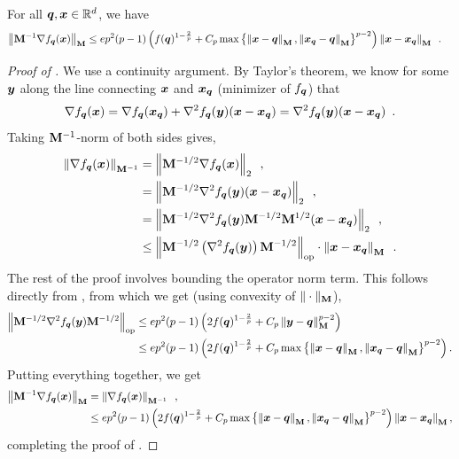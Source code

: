 \begin{lemma}
\label{lemma:self_gradient_norm_small}
For all $\bm{q},\bm{x}\in\mathbb{R}^d$, we have
\begin{align*}
    \left\lVert \mathbf{M}^{-1}\nabla f_{\bm{q}}(\bm{x}) \right\rVert_{\mathbf{M}} &\le ep^2(p-1)\left(f(\bm{q})^{1-\frac{2}{p}}+C_p\max\left\{\left\lVert \bm{x}-\bm{q} \right\rVert_{\mathbf{M}},\left\lVert \bm{x}_{\bm{q}}-\bm{q} \right\rVert_{\mathbf{M}}\right\}^{p-2}\right)\left\lVert \bm{x}-\bm{x}_{\bm{q}} \right\rVert_{\mathbf{M}}\enspace.
\end{align*}
\end{lemma}
\begin{proof}[Proof of ]
We use a continuity argument. By Taylor's theorem, we know for some $\bm{y}$ along the line connecting $\bm{x}$ and $\bm{x}_{\bm{q}}$ (minimizer of $f_{\bm{q}}$) that
\begin{align*}
    \nabla f_{\bm{q}}(\bm{x}) = \nabla f_{\bm{q}}(\bm{x}_{\bm{q}}) + \nabla^2 f_{\bm{q}}(\bm{y})(\bm{x}-\bm{x}_{\bm{q}}) = \nabla^2 f_{\bm{q}}(\bm{y})(\bm{x}-\bm{x}_{\bm{q}})\enspace.
\end{align*}
Taking $\mathbf{M}^{-1}$-norm of both sides gives,
\begin{align*}
    \left\lVert \nabla f_{\bm{q}}(\bm{x}) \right\rVert_{\mathbf{M}^{-1}} &= \left\lVert \mathbf{M}^{-1/2}\nabla f_{\bm{q}}(\bm{x}) \right\rVert_{2}\enspace,\\
     &= \left\lVert \mathbf{M}^{-1/2}\nabla^2 f_{\bm{q}}(\bm{y})(\bm{x}-\bm{x}_{\bm{q}}) \right\rVert_{2}\enspace,\\
     &= \left\lVert \mathbf{M}^{-1/2}\nabla^2 f_{\bm{q}}(\bm{y})\mathbf{M}^{-1/2}\mathbf{M}^{1/2}(\bm{x}-\bm{x}_{\bm{q}}) \right\rVert_{2}\enspace,\\
    &\le \left\lVert \mathbf{M}^{-1/2}\left(\nabla^2 f_{\bm{q}}(\bm{y})\right)\mathbf{M}^{-1/2} \right\rVert_{\mathrm{op}} \cdot \left\lVert \bm{x}-\bm{x}_{\bm{q}} \right\rVert_{\mathbf{M}}\enspace.
\end{align*}
The rest of the proof involves bounding the operator norm term. This follows directly from , from which we get (using convexity of $\|\cdot\|_{\mathbf{M}}$),
\begin{align*}
    \left\lVert \mathbf{M}^{-1/2}\nabla^2 f_{\bm{q}}(\bm{y})\mathbf{M}^{-1/2} \right\rVert_{\mathrm{op}} &\le ep^2(p-1)\left(2f(\bm{q})^{1-\frac{2}{p}}+C_p\left\lVert \bm{y}-\bm{q} \right\rVert_{\mathbf{M}}^{p-2}\right) \\
    &\le ep^2(p-1)\left(2f(\bm{q})^{1-\frac{2}{p}}+C_p\max\left\{\left\lVert \bm{x}-\bm{q} \right\rVert_{\mathbf{M}},\left\lVert \bm{x}_{\bm{q}}-\bm{q} \right\rVert_{\mathbf{M}}\right\}^{p-2}\right).
\end{align*}
Putting everything together, we get
\begin{align*}
    \left\lVert \mathbf{M}^{-1}\nabla f_{\bm{q}}(\bm{x}) \right\rVert_{\mathbf{M}}&= \left\lVert \nabla f_{\bm{q}}(\bm{x}) \right\rVert_{\mathbf{M}^{-1}}\enspace, \\
    &\le ep^2(p-1)\left(2f(\bm{q})^{1-\frac{2}{p}}+C_p\max\left\{\left\lVert \bm{x}-\bm{q} \right\rVert_{\mathbf{M}},\left\lVert \bm{x}_{\bm{q}}-\bm{q} \right\rVert_{\mathbf{M}}\right\}^{p-2}\right)\left\lVert \bm{x}-\bm{x}_{\bm{q}} \right\rVert_{\mathbf{M}},
\end{align*}
completing the proof of .
\end{proof}

